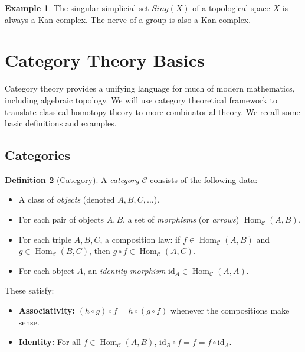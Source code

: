 \documentclass[11pt]{article}
\theoremstyle{definition}
\newtheorem{definition}{Definition}[section]
\newtheorem{example}[definition]{Example}
\theoremstyle{plain}
\begin{document}
\begin{example}
    The singular simplicial set $Sing(X)$ of a topological space $X$ is always a Kan complex. The nerve of a group is also a Kan complex.
\end{example}






\appendix


\section{Category Theory Basics}

Category theory provides a unifying language for much of modern mathematics, including algebraic topology.
We will use category theoretical framework to translate classical homotopy theory to more combinatorial theory.
We recall some basic definitions and examples.



\subsection{Categories}

\begin{definition}[Category]
    A \emph{category} $\mathcal{C}$ consists of the following data:
    \begin{itemize}
        \item A class of \emph{objects} (denoted $A, B, C, \dots$).
        \item For each pair of objects $A, B$, a set of \emph{morphisms} (or \emph{arrows}) $\operatorname{Hom}_{\mathcal{C}}(A, B)$.
        \item For each triple $A, B, C$, a composition law: if $f \in \operatorname{Hom}_{\mathcal{C}}(A, B)$ and $g \in \operatorname{Hom}_{\mathcal{C}}(B, C)$, then $g \circ f \in \operatorname{Hom}_{\mathcal{C}}(A, C)$.
        \item For each object $A$, an \emph{identity morphism} $\mathrm{id}_A \in \operatorname{Hom}_{\mathcal{C}}(A, A)$.
    \end{itemize}
    These satisfy:
    \begin{itemize}
        \item \textbf{Associativity:} $(h \circ g) \circ f = h \circ (g \circ f)$ whenever the compositions make sense.
        \item \textbf{Identity:} For all $f \in \operatorname{Hom}_{\mathcal{C}}(A, B)$, $\mathrm{id}_B \circ f = f = f \circ \mathrm{id}_A$.
    \end{itemize}
\end{definition}
\end{document}
